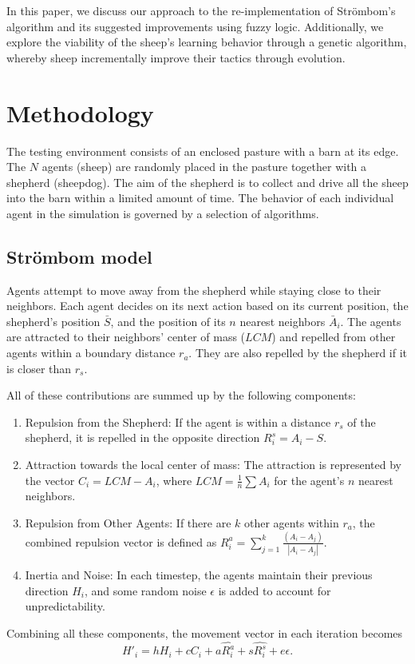 \documentclass[9pt]{pnas-new}
\begin{document}
In this paper, we discuss our approach to the re-implementation of Str\"{o}mbom's algorithm and its suggested improvements using fuzzy logic. Additionally, we explore the viability of the sheep's learning behavior through a genetic algorithm, whereby sheep incrementally improve their tactics through evolution.

\section*{Methodology}
The testing environment consists of an enclosed pasture with a barn at its edge. The $N$ agents (sheep) are randomly placed in the pasture together with a shepherd (sheepdog). The aim of the shepherd is to collect and drive all the sheep into the barn within a limited amount of time. The behavior of each individual agent in the simulation is governed by a selection of algorithms.

\subsection{Str\"{o}mbom model}
Agents attempt to move away from the shepherd while staying close to their neighbors. Each agent decides on its next action based on its current position, the shepherd's position $\bar{S}$, and the position of its $n$ nearest neighbors $\bar{A}_{i}$. The agents are attracted to their neighbors' center of mass ($LCM$) and repelled from other agents within a boundary distance $r_a$. They are also repelled by the shepherd if it is closer than $r_s$.

All of these contributions are summed up by the following components:
\begin{enumerate}
    \item Repulsion from the Shepherd:
    If the agent is within a distance $r_s$ of the shepherd, it is repelled in the opposite direction $R^s_i = A_i - S$.
    
    \item Attraction towards the local center of mass:
    The attraction is represented by the vector $C_i = LCM - A_i$, where $LCM = \frac{1}{n}\sum A_i$ for the agent's $n$ nearest neighbors.
    
    \item Repulsion from Other Agents:
    If there are $k$ other agents within $r_a$, the combined repulsion vector is defined as $R^a_i = \sum^k_{j=1} \frac{(A_i - A_j)}{|A_i - A_j|}$.
    
    \item Inertia and Noise:
    In each timestep, the agents maintain their previous direction $H_i$, and some random noise $\epsilon$ is added to account for unpredictability.
\end{enumerate}
Combining all these components, the movement vector in each iteration becomes $$H'_i = h H_i + c C_i + a \hat{R_i^a} + s \hat{R_i^s} + e \epsilon.$$
\end{document}
